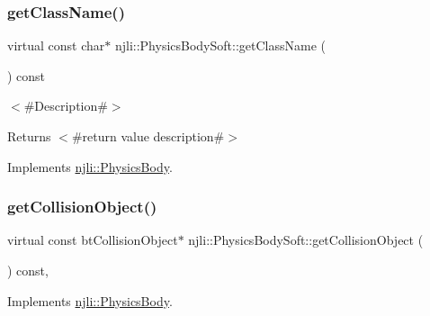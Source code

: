 \mbox{\label{classnjli_1_1_physics_body_soft_a1d3ad459c9527251dfdef541ae44c850}} 
\subsubsection{\texorpdfstring{get\+Class\+Name()}{getClassName()}}
{\footnotesize\ttfamily virtual const char$\ast$ njli\+::\+Physics\+Body\+Soft\+::get\+Class\+Name (\begin{DoxyParamCaption}{ }\end{DoxyParamCaption}) const\hspace{0.3cm}{\ttfamily [virtual]}}

$<$\#\+Description\#$>$

\begin{DoxyReturn}{Returns}
$<$\#return value description\#$>$ 
\end{DoxyReturn}


Implements \mbox{\hyperlink{classnjli_1_1_physics_body_a9ba235d39a1b994f22a13edeff862ba3}{njli\+::\+Physics\+Body}}.

\mbox{\label{classnjli_1_1_physics_body_soft_a41f7c080d5c79ed719cfcfb0de35a449}} 
\subsubsection{\texorpdfstring{get\+Collision\+Object()}{getCollisionObject()}\hspace{0.1cm}{\footnotesize\ttfamily [1/2]}}
{\footnotesize\ttfamily virtual const bt\+Collision\+Object$\ast$ njli\+::\+Physics\+Body\+Soft\+::get\+Collision\+Object (\begin{DoxyParamCaption}{ }\end{DoxyParamCaption}) const\hspace{0.3cm}{\ttfamily [protected]}, {\ttfamily [virtual]}}



Implements \mbox{\hyperlink{classnjli_1_1_physics_body_a48031c76bbe2bd9c4540d6d27b8b42bb}{njli\+::\+Physics\+Body}}.

